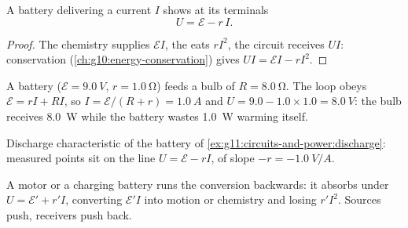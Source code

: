 \begin{proposition}\label{prop:g11:circuits-and-power:terminal}
A battery delivering a current $I$ shows at its terminals
\[ U = \mathcal{E} - r\,I . \]
\end{proposition}

\begin{proof}
The chemistry supplies $\mathcal{E}I$, the  eats
$rI^2$, the circuit receives $UI$:  conservation
(\cref{ch:g10:energy-conservation}) gives $UI = \mathcal{E}I - rI^2$.
\end{proof}

\begin{example}\label{ex:g11:circuits-and-power:discharge}
A battery ($\mathcal{E} = \qty{9.0}{V}$, $r = \qty{1.0}{\ohm}$) feeds a
bulb of  $R = \qty{8.0}{\ohm}$. The loop obeys $\mathcal{E} =
rI + RI$, so $I = \mathcal{E}/(R + r) = \qty{1.0}{A}$ and $U = 9.0 -
1.0 \times 1.0 = \qty{8.0}{V}$: the bulb receives \qty{8.0}{W} while the
battery wastes \qty{1.0}{W} warming itself.
\end{example}

\begin{omfigure}

{\small Discharge characteristic of the battery of
\cref{ex:g11:circuits-and-power:discharge}: measured points sit on the
line $U = \mathcal{E} - rI$, of slope $-r = \qty{-1.0}{V/A}$.}
\end{omfigure}

\begin{remark}[Receivers]\label{rem:g11:circuits-and-power:receivers}
A motor or a charging battery runs the conversion backwards: it absorbs
under $U = \mathcal{E}' + r'I$, converting $\mathcal{E}'I$ into motion or
chemistry and losing $r'I^2$. Sources push, receivers push back.
\end{remark}

